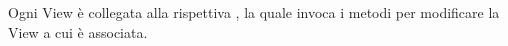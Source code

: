 Ogni View è collegata alla rispettiva , la quale invoca i metodi per modificare la View a cui è associata.
